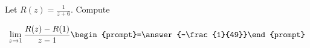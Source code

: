 \documentclass{ximera}
\author{Bart Snapp}
\begin{document}
\begin{exercise}
Let $R(z) = \frac{1}{z+6}$. Compute

\[
\lim_{ z\to 1 } 
\frac{R(z)-R(1)}{z-1} \begin{prompt}=\answer{-\frac{1}{49}}\end{prompt}
\]
\end{exercise}
\end{document}
